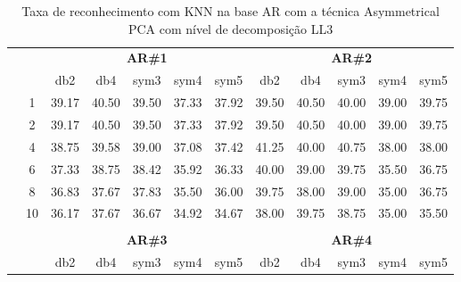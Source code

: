 \begin{table}[H]
	\centering
    \normalsize
	\caption{Taxa de reconhecimento com KNN na base AR com a técnica Asymmetrical PCA com nível de decomposição LL3}
	\begin{tabular}{|c|c|c c c c c|c c c c c|}
\cline{3-12}
\multicolumn{2}{c|}{\multirow{2}{*}{}} & \multicolumn{5}{c|}{\textbf{AR\#1}}  & \multicolumn{5}{c|}{\textbf{AR\#2}} \\\cline{3-12}

\multicolumn{2}{c|}{}  & db2 & db4 & sym3 & sym4 & sym5 & db2 & db4& sym3 & sym4 & sym5 \\\hline

\multicolumn{1}{|c|}{ \multirow{5}{*}{\rotatebox[origin=c]{90}{\textbf{K-vizinhos}}} }
&1	&39.17	&40.50	&39.50	&37.33	&37.92	&39.50	&40.50	&40.00	&39.00	&39.75\\\cline{2-12}
&2	&39.17	&40.50	&39.50	&37.33	&37.92	&39.50	&40.50	&40.00	&39.00	&39.75\\\cline{2-12}
&4	&38.75	&39.58	&39.00	&37.08	&37.42	&41.25	&40.00	&40.75	&38.00	&38.00\\\cline{2-12}
&6	&37.33	&38.75	&38.42	&35.92	&36.33	&40.00	&39.00	&39.75	&35.50	&36.75\\\cline{2-12}
&8	&36.83	&37.67	&37.83	&35.50	&36.00	&39.75	&38.00	&39.00	&35.00	&36.75\\\cline{2-12}
&10	&36.17	&37.67	&36.67	&34.92	&34.67	&38.00	&39.75	&38.75	&35.00	&35.50\\ \midrule
\multicolumn{12}{c}{}\\ 




\cline{3-12}
\multicolumn{2}{c}{} & \multicolumn{5}{|c|}{\textbf{AR\#3}}  & \multicolumn{5}{c|}{\textbf{AR\#4}} \\\cline{3-12}
\multicolumn{2}{c}{}  & \multicolumn{1}{|c}{db2} & db4 & sym3 & sym4 & sym5 & db2 & db4& sym3 & sym4 & sym5 \\\hline


\end{tabular}
\end{table}
